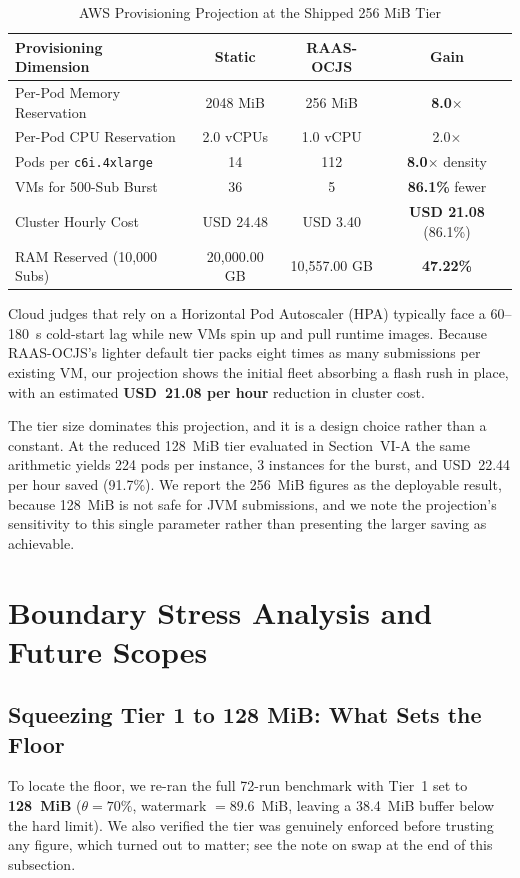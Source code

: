 \documentclass[conference]{IEEEtran}
\begin{document}
\begin{table}[!t]
\caption{AWS Provisioning Projection at the Shipped 256 MiB Tier}
\label{tab:cloud}
\centering
\small
\begin{tabular}{|P{4.2cm}|c|c|c|}
\hline
\textbf{Provisioning Dimension} & \textbf{Static} & \textbf{RAAS-OCJS} & \textbf{Gain} \\
\hline
Per-Pod Memory Reservation & 2048 MiB & 256 MiB & \textbf{8.0$\times$} \\
\hline
Per-Pod CPU Reservation & 2.0 vCPUs & 1.0 vCPU & 2.0$\times$ \\
\hline
Pods per \texttt{c6i.4xlarge} & 14 & 112 & \textbf{8.0$\times$} density \\
\hline
VMs for 500-Sub Burst & 36 & 5 & \textbf{86.1\%} fewer \\
\hline
Cluster Hourly Cost & USD 24.48 & USD 3.40 & \textbf{USD 21.08} (86.1\%) \\
\hline
RAM Reserved (10,000 Subs) & 20,000.00 GB & 10,557.00 GB & \textbf{47.22\%} \\
\hline
\end{tabular}
\end{table}

Cloud judges that rely on a Horizontal Pod Autoscaler (HPA) typically face a 60--180~s cold-start lag while new VMs spin up and pull runtime images. Because RAAS-OCJS's lighter default tier packs eight times as many submissions per existing VM, our projection shows the initial fleet absorbing a flash rush in place, with an estimated \textbf{USD~21.08 per hour} reduction in cluster cost.

The tier size dominates this projection, and it is a design choice rather than a constant. At the reduced 128~MiB tier evaluated in Section~VI-A the same arithmetic yields 224 pods per instance, 3 instances for the burst, and USD~22.44 per hour saved (91.7\%). We report the 256~MiB figures as the deployable result, because 128~MiB is not safe for JVM submissions, and we note the projection's sensitivity to this single parameter rather than presenting the larger saving as achievable.

\section{Boundary Stress Analysis and Future Scopes}

\subsection{Squeezing Tier 1 to 128 MiB: What Sets the Floor}
\label{sec:boundary}
To locate the floor, we re-ran the full 72-run benchmark with Tier~1 set to \textbf{128~MiB} ($\theta = 70\%$, watermark $= 89.6$~MiB, leaving a 38.4~MiB buffer below the hard limit). We also verified the tier was genuinely enforced before trusting any figure, which turned out to matter; see the note on swap at the end of this subsection.
\end{document}
